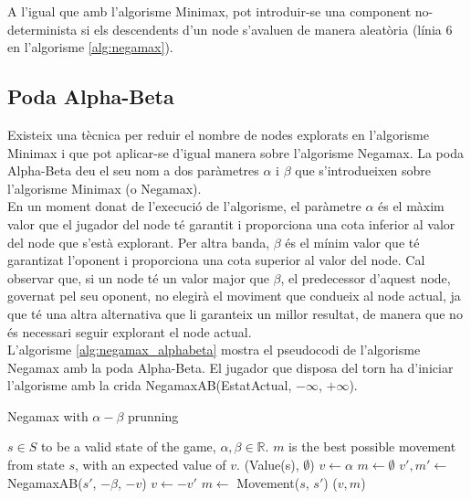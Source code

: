 \documentclass[12pt,a4paper]{article}
\begin{document}
A l'igual que amb l'algorisme Minimax, pot introduir-se una component no-determinista si els descendents d'un node s'avaluen de manera aleatòria (línia 6 en l'algorisme \ref{alg:negamax}).\\

\subsection{Poda Alpha-Beta}
Existeix una tècnica per reduir el nombre de nodes explorats en l'algorisme Minimax\cite{richards1961alpha} i que pot aplicar-se d'igual manera sobre l'algorisme Negamax\cite{knuth1976analysis}. La poda Alpha-Beta deu el seu nom a dos paràmetres $\alpha$ i $\beta$ que s'introdueixen sobre l'algorisme Minimax (o Negamax). \\

En un moment donat de l'execució de l'algorisme, el paràmetre $\alpha$ és el màxim valor que el jugador del node té garantit i proporciona una cota inferior al valor del node que s'està explorant. Per altra banda, $\beta$ és el mínim valor que té garantizat l'oponent i proporciona una cota superior al valor del node. Cal observar que, si un node té un valor major que $\beta$, el predecessor d'aquest node, governat pel seu oponent, no elegirà el moviment que condueix al node actual, ja que té una altra alternativa que li garanteix un millor resultat, de manera que no és necessari seguir explorant el node actual.\\

L'algorisme \ref{alg:negamax_alphabeta} mostra el pseudocodi de l'algorisme Negamax amb la poda Alpha-Beta. El jugador que disposa del torn ha d'iniciar l'algorisme amb la crida NegamaxAB(EstatActual, $-\infty$, $+\infty$).

\begin{algorithm}[H]
\caption{Negamax with $\alpha-\beta$ prunning}
\label{alg:negamax_alphabeta}
\begin{algorithmic}[5]
\Require $s \in S$ to be a valid state of the game, $\alpha,\beta \in \mathbb{R}$.
\Ensure $m$ is the best possible movement from state $s$, with an expected value of $v$. 
	\State \Return (Value(s), $\emptyset$)
\Else
	\State $v \leftarrow \alpha$
	\State $m \leftarrow \emptyset$
		\State $v',m' \leftarrow$ NegamaxAB($s'$, $-\beta$, $-v$)
			\State $v \leftarrow -v'$
			\State $m \leftarrow$ Movement($s$, $s'$)
		\EndIf
	\EndFor
	\State \Return ($v, m$)
\EndIf
\end{algorithmic}
\end{algorithm}
\end{document}

